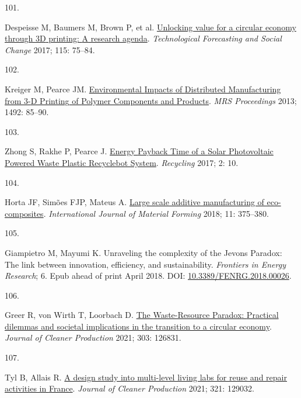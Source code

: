 \documentclass[
  12pt,
  a4paperpaper,
  onecolumn]{article}
\newlength{\cslhangindent}
\newlength{\csllabelwidth}
\newlength{\cslentryspacingunit} %
\newenvironment{CSLReferences}[2] %
 {%
  \setlength{\parindent}{0pt}
  \ifodd #1
  \let\oldpar\par
  \def\par{\hangindent=\cslhangindent\oldpar}
  \fi
  \setlength{\parskip}{#2\cslentryspacingunit}
 }%
 {}
\newcommand{\CSLLeftMargin}[1]{\parbox[t]{\csllabelwidth}{#1}}
\newcommand{\CSLRightInline}[1]{\parbox[t]{\linewidth - \csllabelwidth}{#1}\break}
\begin{document}
\begin{CSLReferences}{0}{0}
\leavevmode{}%
\CSLLeftMargin{101. }%
\CSLRightInline{Despeisse M, Baumers M, Brown P, et al.
\href{https://doi.org/10.1016/j.techfore.2016.09.021}{Unlocking value
for a circular economy through {3D} printing: {A} research agenda}.
\emph{Technological Forecasting and Social Change} 2017; 115: 75--84.}

\leavevmode{}%
\CSLLeftMargin{102. }%
\CSLRightInline{Kreiger M, Pearce JM.
\href{https://doi.org/10.1557/opl.2013.319}{Environmental {Impacts} of
{Distributed Manufacturing} from 3-{D Printing} of {Polymer Components}
and {Products}}. \emph{MRS Proceedings} 2013; 1492: 85--90.}

\leavevmode{}%
\CSLLeftMargin{103. }%
\CSLRightInline{Zhong S, Rakhe P, Pearce J.
\href{https://doi.org/10.3390/recycling2020010}{Energy {Payback Time} of
a {Solar Photovoltaic Powered Waste Plastic Recyclebot System}}.
\emph{Recycling} 2017; 2: 10.}

\leavevmode{}%
\CSLLeftMargin{104. }%
\CSLRightInline{Horta JF, Simões FJP, Mateus A.
\href{https://doi.org/10.1007/s12289-017-1364-5}{Large scale additive
manufacturing of eco-composites}. \emph{International Journal of
Material Forming} 2018; 11: 375--380.}

\leavevmode{}%
\CSLLeftMargin{105. }%
\CSLRightInline{Giampietro M, Mayumi K. Unraveling the complexity of the
{Jevons Paradox}: {The} link between innovation, efficiency, and
sustainability. \emph{Frontiers in Energy Research}; 6. Epub ahead of
print April 2018. DOI:
\href{https://doi.org/10.3389/FENRG.2018.00026}{10.3389/FENRG.2018.00026}.}

\leavevmode{}%
\CSLLeftMargin{106. }%
\CSLRightInline{Greer R, von Wirth T, Loorbach D.
\href{https://doi.org/10.1016/j.jclepro.2021.126831}{The {Waste-Resource
Paradox}: {Practical} dilemmas and societal implications in the
transition to a circular economy}. \emph{Journal of Cleaner Production}
2021; 303: 126831.}

\leavevmode{}%
\CSLLeftMargin{107. }%
\CSLRightInline{Tyl B, Allais R.
\href{https://doi.org/10.1016/J.JCLEPRO.2021.129032}{A design study into
multi-level living labs for reuse and repair activities in {France}}.
\emph{Journal of Cleaner Production} 2021; 321: 129032.}


\end{CSLReferences}
\end{document}
